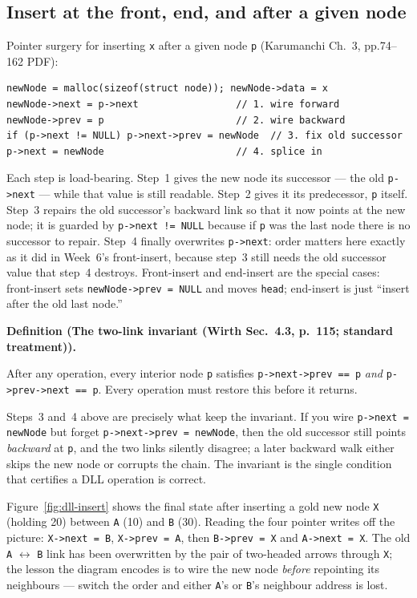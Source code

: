 \documentclass[11pt]{article}
\newenvironment{definitionbox}[1]{%
  \par\noindent\textbf{Definition (#1).}\ \itshape
}{\par\vspace{0.3em}}
\begin{document}
\subsection{Insert at the front, end, and after a given node}

Pointer surgery for inserting \texttt{x} after a given node \texttt{p} (Karumanchi Ch.~3, pp.74--162 PDF):

{\footnotesize
\begin{verbatim}
newNode = malloc(sizeof(struct node)); newNode->data = x
newNode->next = p->next                 // 1. wire forward
newNode->prev = p                       // 2. wire backward
if (p->next != NULL) p->next->prev = newNode  // 3. fix old successor
p->next = newNode                       // 4. splice in
\end{verbatim}
}

Each step is load-bearing. Step~1 gives the new node its successor --- the old \texttt{p->next} --- while that value is still readable. Step~2 gives it its predecessor, \texttt{p} itself. Step~3 repairs the old successor's backward link so that it now points at the new node; it is guarded by \texttt{p->next != NULL} because if \texttt{p} was the last node there is no successor to repair. Step~4 finally overwrites \texttt{p->next}: order matters here exactly as it did in Week~6's front-insert, because step~3 still needs the old successor value that step~4 destroys. Front-insert and end-insert are the special cases: front-insert sets \texttt{newNode->prev = NULL} and moves \texttt{head}; end-insert is just ``insert after the old last node.''

\begin{definitionbox}{The two-link invariant (Wirth Sec.~4.3, p.~115; standard treatment)}
After any operation, every interior node \texttt{p} satisfies \texttt{p->next->prev == p} \emph{and} \texttt{p->prev->next == p}. Every operation must restore this before it returns.
\end{definitionbox}

Steps~3 and~4 above are precisely what keep the invariant. If you wire \texttt{p->next = newNode} but forget \texttt{p->next->prev = newNode}, then the old successor still points \emph{backward} at \texttt{p}, and the two links silently disagree; a later backward walk either skips the new node or corrupts the chain. The invariant is the single condition that certifies a DLL operation is correct.

Figure~\ref{fig:dll-insert} shows the final state after inserting a gold new node \texttt{X} (holding 20) between \texttt{A} (10) and \texttt{B} (30). Reading the four pointer writes off the picture: \texttt{X->next = B}, \texttt{X->prev = A}, then \texttt{B->prev = X} and \texttt{A->next = X}. The old \texttt{A} $\leftrightarrow$ \texttt{B} link has been overwritten by the pair of two-headed arrows through \texttt{X}; the lesson the diagram encodes is to wire the new node \emph{before} repointing its neighbours --- switch the order and either \texttt{A}'s or \texttt{B}'s neighbour address is lost.
\end{document}
